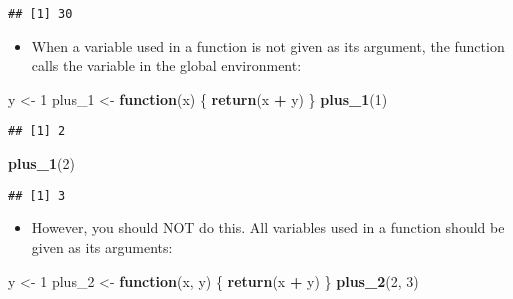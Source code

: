 \documentclass[
]{book}
\newenvironment{Shaded}{\begin{snugshade}}{\end{snugshade}}
\newcommand{\ControlFlowTok}[1]{\textcolor[rgb]{0.13,0.29,0.53}{\textbf{#1}}}
\newcommand{\DecValTok}[1]{\textcolor[rgb]{0.00,0.00,0.81}{#1}}
\newcommand{\KeywordTok}[1]{\textcolor[rgb]{0.13,0.29,0.53}{\textbf{#1}}}
\newcommand{\NormalTok}[1]{#1}
\newcommand{\OperatorTok}[1]{\textcolor[rgb]{0.81,0.36,0.00}{\textbf{#1}}}
\newcommand{\StringTok}[1]{\textcolor[rgb]{0.31,0.60,0.02}{#1}}
\providecommand{\tightlist}{%
  \setlength{\itemsep}{0pt}\setlength{\parskip}{0pt}}
\begin{document}
\begin{verbatim}
## [1] 30
\end{verbatim}

\begin{itemize}
\tightlist
\item
  When a variable used in a function is not given as its argument, the function calls the variable in the global environment:
\end{itemize}

\begin{Shaded}
\begin{Highlighting}[]
\NormalTok{y <-}\StringTok{ }\DecValTok{1}
\NormalTok{plus_}\DecValTok{1}\NormalTok{ <-}\StringTok{ }\ControlFlowTok{function}\NormalTok{(x) \{}
  \KeywordTok{return}\NormalTok{(x }\OperatorTok{+}\StringTok{ }\NormalTok{y)}
\NormalTok{\}}
\KeywordTok{plus_1}\NormalTok{(}\DecValTok{1}\NormalTok{)}
\end{Highlighting}
\end{Shaded}

\begin{verbatim}
## [1] 2
\end{verbatim}

\begin{Shaded}
\begin{Highlighting}[]
\KeywordTok{plus_1}\NormalTok{(}\DecValTok{2}\NormalTok{)}
\end{Highlighting}
\end{Shaded}

\begin{verbatim}
## [1] 3
\end{verbatim}

\begin{itemize}
\tightlist
\item
  However, you should NOT do this. All variables used in a function should be given as its arguments:
\end{itemize}

\begin{Shaded}
\begin{Highlighting}[]
\NormalTok{y <-}\StringTok{ }\DecValTok{1}
\NormalTok{plus_}\DecValTok{2}\NormalTok{ <-}\StringTok{ }\ControlFlowTok{function}\NormalTok{(x, y) \{}
  \KeywordTok{return}\NormalTok{(x }\OperatorTok{+}\StringTok{ }\NormalTok{y)}
\NormalTok{\}}
\KeywordTok{plus_2}\NormalTok{(}\DecValTok{2}\NormalTok{, }\DecValTok{3}\NormalTok{)}
\end{Highlighting}
\end{Shaded}
\end{document}
